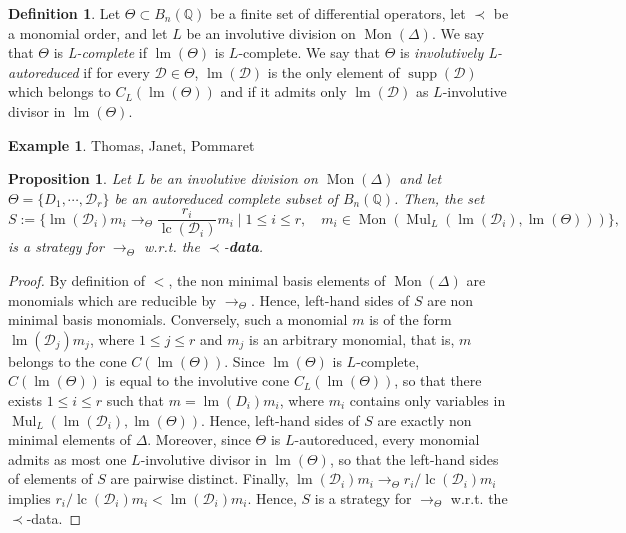\documentclass[10pt]{easychair}
\newtheorem{proposition}[theorem]{Proposition}
\theoremstyle{definition}
\newtheorem{definition}[theorem]{Definition}
\newtheorem{example}[theorem]{Example}
\newcommand\data{{\color{red}\bf data}}
\DeclareMathOperator{\supp}{supp}
\newcommand\D{\mathcal{D}}
\DeclareMathOperator{\lm}{lm}
\DeclareMathOperator{\lc}{lc}
\newcommand\Q{\mathbb{Q}}
\newcommand\Weyl[1]{B_{#1}(\Q)}
\DeclareMathOperator{\Mon}{Mon}
\DeclareMathOperator{\Mul}{Mul}
\newcommand\rewTheta{\to_{\Theta}}
\begin{document}
\begin{definition}
  Let $\Theta\subset\Weyl{n}$ be a finite set of differential operators,
  let $\prec$ be a monomial order, and let $L$ be an involutive division
  on $\Mon(\Delta)$. We say that $\Theta$ is {\em L-complete} if
  $\lm(\Theta)$ is $L$-complete. We say that $\Theta$ is
  {\em involutively L-autoreduced} if for every $\D\in\Theta$, $\lm(\D)$
  is the only element of $\supp(\D)$ which belongs to $C_L(\lm(\Theta))$
  and if it admits only $\lm(\D)$ as $L$-involutive divisor in
  $\lm(\Theta)$.
\end{definition}

\begin{example}
  Thomas, Janet, Pommaret
\end{example}

\begin{proposition}
  Let L be an involutive division on $\Mon(\Delta)$ and let
  $\Theta=\{D_1,\cdots,\D_r\}$ be an autoreduced complete subset of
  $\Weyl{n}$. Then, the set 
  \[S:=\{\lm(\D_i)m_i\rewTheta\frac{r_i}{\lc(\D_i)}m_i\mid1\leq i\leq r,
  \quad m_i\in\Mon(\Mul_L(\lm(\D_i),\lm(\Theta)))\},\]
  is a strategy for $\rewTheta$ w.r.t. the $\prec$-\data.
\end{proposition}

\begin{proof}
  By definition of $<$, the non minimal basis elements of $\Mon(\Delta)$
  are monomials which are reducible by $\rewTheta$. Hence, left-hand
  sides of $S$ are non minimal basis monomials. Conversely, such a
  monomial $m$ is of the form $\lm(\D_j)m_j$, where $1\leq j\leq r$ and
  $m_j$ is an arbitrary monomial, that is, $m$ belongs to the cone
  $C(\lm(\Theta))$. Since $\lm(\Theta)$ is $L$-complete, $C(\lm(\Theta))$
  is equal to the involutive cone $C_L(\lm(\Theta))$, so that there
  exists $1\leq i\leq r$ such that $m=\lm(D_i)m_i$, where $m_i$ contains
  only variables in $\Mul_L(\lm(\D_i),\lm(\Theta))$. Hence, left-hand
  sides of $S$ are exactly non minimal elements of $\Delta$. Moreover,
  since $\Theta$ is $L$-autoreduced, every monomial admits as most one
  $L$-involutive divisor in $\lm(\Theta)$, so that the left-hand sides
  of elements of $S$ are pairwise distinct. Finally,
  $\lm(\D_i)m_i\rewTheta r_i/\lc(\D_i)m_i$ implies
  $r_i/\lc(\D_i)m_i<\lm(\D_i)m_i$. Hence, $S$ is a strategy for
  $\rewTheta$ w.r.t. the $\prec$-data.
\end{proof}
\end{document}

